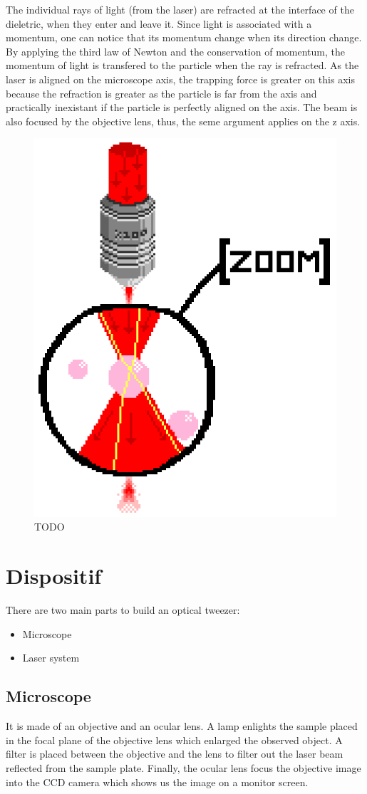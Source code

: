 \documentclass[a4paper,12pt,twoside]{article}	%
\begin{document}
The individual rays of light (from the laser) are refracted at the interface of the dieletric, when they enter and leave it.
Since light is associated with a momentum, one can notice that its momentum change when its direction change.
By applying the third law of Newton and the conservation of momentum, the momentum of light is transfered to the particle when the ray is refracted.
As the laser is aligned on the microscope axis, the trapping force is greater on this axis because
 the refraction is greater as the particle is far from the axis and practically inexistant if the particle is perfectly aligned on the axis.
The beam is also focused by the objective lens, thus, the seme argument applies on the z axis.



\begin{figure}[h]
	\begin{center}
	\includegraphics[width=0.5\linewidth,angle=0]{./figures/lazor_zoom}
	\caption{TODO} \label{fig:theory}
	\end{center}
\end{figure}

\section{Dispositif}
There are two main parts to build an optical tweezer:
\begin{itemize}
	\item Microscope
	\item Laser system
\end{itemize}

\subsection{Microscope}
It is made of an objective and an ocular lens. A lamp enlights the sample placed in the focal plane of the objective lens which enlarged the observed object. A filter is placed between the objective and the lens to filter out the laser beam reflected from the sample plate. Finally, the ocular lens focus the objective image into the CCD camera which shows us the image on a monitor screen.
\end{document}
